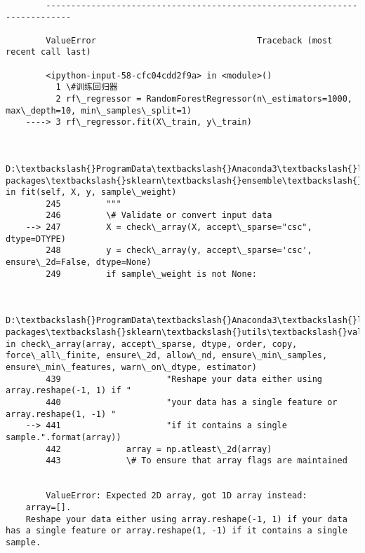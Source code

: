 \documentclass[11pt]{article}
\begin{document}
    \begin{Verbatim}[commandchars=\\\{\}]

        ---------------------------------------------------------------------------

        ValueError                                Traceback (most recent call last)

        <ipython-input-58-cfc04cdd2f9a> in <module>()
          1 \#训练回归器
          2 rf\_regressor = RandomForestRegressor(n\_estimators=1000, max\_depth=10, min\_samples\_split=1)
    ----> 3 rf\_regressor.fit(X\_train, y\_train)
    

        D:\textbackslash{}ProgramData\textbackslash{}Anaconda3\textbackslash{}lib\textbackslash{}site-packages\textbackslash{}sklearn\textbackslash{}ensemble\textbackslash{}forest.py in fit(self, X, y, sample\_weight)
        245         """
        246         \# Validate or convert input data
    --> 247         X = check\_array(X, accept\_sparse="csc", dtype=DTYPE)
        248         y = check\_array(y, accept\_sparse='csc', ensure\_2d=False, dtype=None)
        249         if sample\_weight is not None:
    

        D:\textbackslash{}ProgramData\textbackslash{}Anaconda3\textbackslash{}lib\textbackslash{}site-packages\textbackslash{}sklearn\textbackslash{}utils\textbackslash{}validation.py in check\_array(array, accept\_sparse, dtype, order, copy, force\_all\_finite, ensure\_2d, allow\_nd, ensure\_min\_samples, ensure\_min\_features, warn\_on\_dtype, estimator)
        439                     "Reshape your data either using array.reshape(-1, 1) if "
        440                     "your data has a single feature or array.reshape(1, -1) "
    --> 441                     "if it contains a single sample.".format(array))
        442             array = np.atleast\_2d(array)
        443             \# To ensure that array flags are maintained
    

        ValueError: Expected 2D array, got 1D array instead:
    array=[].
    Reshape your data either using array.reshape(-1, 1) if your data has a single feature or array.reshape(1, -1) if it contains a single sample.

    \end{Verbatim}


    
    
    
    
\end{document}
